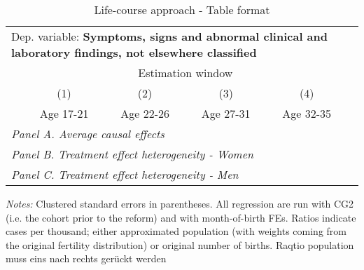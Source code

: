  \begin{table}[H] \centering \begin{threeparttable} \caption{Life-course approach - Table format} {\def\sym#1{\ifmmode^{#1}\else\(^{#1}\)\fi} \begin{tabular}{l*{5}{c}} \toprule \multicolumn{5}{l}{Dep. variable: \textbf{Symptoms, signs and abnormal clinical and laboratory findings, not elsewhere classified}} \\ & \multicolumn{4}{c}{Estimation window} \\ \cmidrule(lr){2-5}
            &\multicolumn{1}{c}{(1)}&\multicolumn{1}{c}{(2)}&\multicolumn{1}{c}{(3)}&\multicolumn{1}{c}{(4)}\\
            &\multicolumn{1}{c}{Age 17-21}&\multicolumn{1}{c}{Age 22-26}&\multicolumn{1}{c}{Age 27-31}&\multicolumn{1}{c}{Age 32-35}\\
\midrule
 \multicolumn{5}{l}{\emph{Panel A. Average causal effects}} \\      \midrule\multicolumn{5}{l}{\emph{Panel B. Treatment effect heterogeneity - Women}} \\      \midrule\multicolumn{5}{l}{\emph{Panel C. Treatment effect heterogeneity - Men}} \\      
\bottomrule \end{tabular} } \begin{tablenotes} \item \scriptsize \emph{Notes:} Clustered standard errors in parentheses. All regression are run with CG2 (i.e. the cohort prior to the reform) and with month-of-birth FEs. Ratios indicate cases per thousand; either approximated population (with weights coming from the original fertility distribution) or original number of births. Raqtio population muss eins nach rechts gerückt werden \end{tablenotes} \end{threeparttable} \end{table} 
